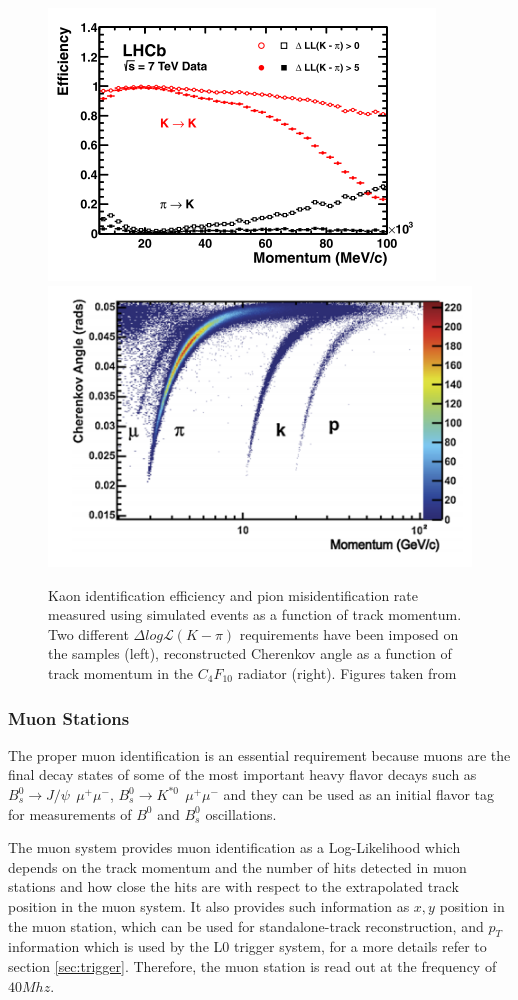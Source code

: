 \begin{figure}[h]
 \begin{center}
  \includegraphics[width=0.49\linewidth]{figures/Kaon_proton.PNG}
   \includegraphics[width=0.49\linewidth]{figures/Chernkov_angle.PNG}
    \caption{Kaon identification efficiency and pion misidentification rate measured using simulated events as a function of track momentum. Two different $\Delta log \mathcal{L}(K − \pi)$ requirements have been imposed on the
samples (left), reconstructed Cherenkov angle as a function of track momentum in the $C_4F_{10}$ radiator (right). Figures taken from \cite{RICH_performance}}%
    \label{fig:RICH_performance}%
 \end{center}
\end{figure}


\subsubsection{Muon Stations}

The proper muon identification is an essential requirement because muons are the final decay states of some of the most important heavy flavor decays such as $B_s^0 \rightarrow J/\psi ~~ \mu^{+}\mu^{-}$,  $B^{0}_s \rightarrow K^{*0} ~~ \mu^{+}\mu^{-}$ and they can be used as an initial flavor tag for measurements of $B^0$  and $B^0_{s}$ oscillations. 

The muon system provides muon identification as a Log-Likelihood which depends on the track momentum and the number of hits detected in muon stations and how close the hits are with respect to the extrapolated track position in the muon system. It also provides such information as $x,y$ position in the muon station, which can be used for standalone-track reconstruction, and $p_T$ information which is used by the L0 trigger system, for a more details refer to section \ref{sec:trigger}. Therefore, the muon station is read out at the frequency of $40 Mhz$. 

